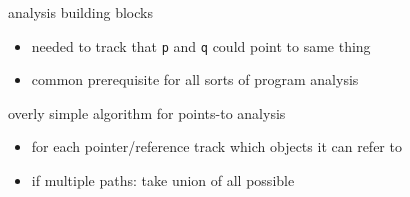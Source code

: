 \usetikzlibrary{arrows.meta}

\begin{frame}{analysis building blocks}
    \begin{itemize}
    \item needed to track that \texttt{p} and \texttt{q} could point to same thing
    \vspace{.5cm}
    \item common prerequisite for all sorts of program analysis
    \end{itemize}
\end{frame}

\begin{frame}{overly simple algorithm for points-to analysis}
\begin{itemize}
\item for each pointer/reference track which objects it can refer to
\item if multiple paths: take union of all possible
\end{itemize}
\end{frame}

